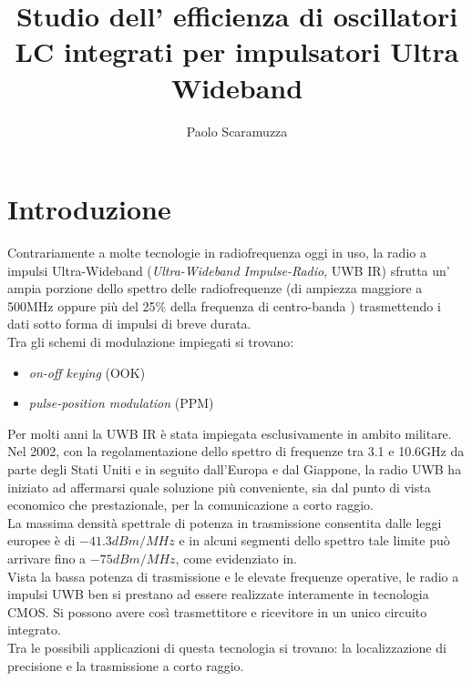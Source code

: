 \documentclass[a4paper, 12pt]{memoir}
\author{Paolo Scaramuzza}
\title{Studio dell' efficienza di oscillatori LC integrati per impulsatori 
	Ultra Wideband}
\date{} %
\begin{document}

\cleardoublepage{}
\newpage
{} %
\begin{vplace}[0.7]
	
\end{vplace}
\cleardoublepage{}
\newpage
\tableofcontents

\chapter{Introduzione}
Contrariamente a molte tecnologie in radiofrequenza oggi in uso, la radio a
impulsi Ultra-Wideband (\emph{Ultra-Wideband Impulse-Radio}, UWB IR)
sfrutta un' ampia porzione dello spettro delle radiofrequenze (di ampiezza
maggiore a 500MHz oppure più del 25\% della frequenza di centro-banda
\cite{Neviani12}) trasmettendo i dati sotto forma di impulsi di breve durata.\\
Tra gli schemi di modulazione impiegati si trovano: 
\begin{itemize}
	\item \emph{on-off keying} (OOK)
	\item \emph{pulse-position modulation} (PPM)
\end{itemize}

Per molti anni la UWB IR è stata impiegata esclusivamente in ambito
militare. Nel 2002, con la regolamentazione dello spettro di frequenze tra 3.1 
e 10.6GHz da parte degli Stati Uniti e in seguito dall'Europa e dal Giappone,
la radio UWB ha iniziato ad affermarsi quale soluzione più conveniente, sia dal
punto di vista economico che prestazionale, per la comunicazione a corto raggio.
\\La massima densità spettrale di potenza in trasmissione consentita dalle
leggi europee è di $ -41.3 dBm/MHz $ e in alcuni segmenti dello spettro tale
limite può arrivare fino a $ -75 dBm/MHz $, come evidenziato in\cite{Hirt07}.\\
Vista la bassa potenza di trasmissione e le elevate frequenze operative,
le radio a impulsi UWB ben si prestano ad essere realizzate interamente in
tecnologia CMOS.\@
Si possono avere così trasmettitore e ricevitore in un unico circuito integrato.
\\Tra le possibili applicazioni di questa tecnologia si trovano: la
localizzazione di precisione e la trasmissione a corto raggio.
\end{document}
